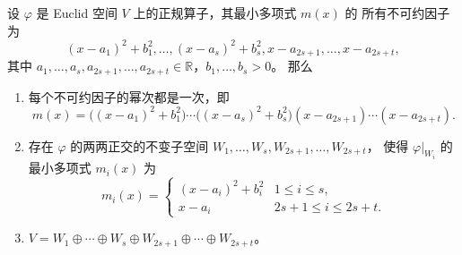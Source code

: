 \documentclass[fontset=none,zihao=-4]{Notes}
\begin{document}
\begin{theorem}\label{thm:property of real normal operator}
  设 $\varphi$ 是 Euclid 空间 $V$ 上的正规算子，其最小多项式 $m(x)$ 的
  所有不可约因子为
  \[
    (x-a_1)^2+b_1^2,\dots,(x-a_s)^2+b_s^2,x-a_{2s+1} ,\dots,x-a_{2s+t},
  \]
  其中 $a_1,\dots,a_s,a_{2s+1},\dots,a_{2s+t}\in\mathbb{R}$，$b_1,\dots,b_s>0$。
  那么
  \begin{enumerate}
    \item 每个不可约因子的幂次都是一次，即
    \[
      m(x)=\bigl((x-a_1)^2+b_1^2\bigr)\cdots
      \bigl((x-a_s)^2+b_s^2\bigr)(x-a_{2s+1})\cdots(x-a_{2s+t}).
    \]
    \item 存在 $\varphi$ 的两两正交的不变子空间 $W_1,\dots,W_s,W_{2s+1},\dots,W_{2s+t}$，
    使得 $\varphi|_{W_i}$ 的最小多项式 $m_i(x)$ 为
    \[
      m_i(x)=
      \begin{cases}
        (x-a_i)^2+b_i^2 & 1\leq i\leq s,\\
        x-a_i & 2s+1\leq i\leq 2s+t.
      \end{cases}  
    \]
    \item $V=W_1\oplus\cdots\oplus W_s\oplus W_{2s+1}\oplus \cdots\oplus W_{2s+t}$。
  \end{enumerate}
\end{theorem}
\end{document}

